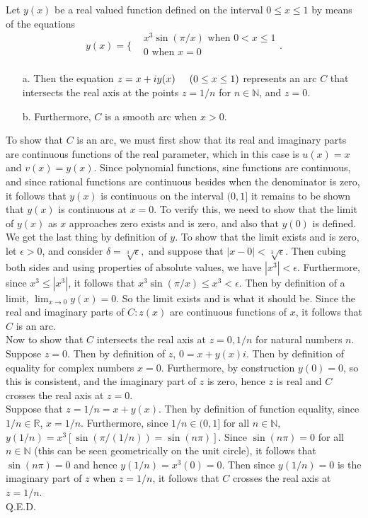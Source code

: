 \documentclass{article}
\theoremstyle{definition}
\newcommand{\R}{\mathbb{R}}
\newcommand{\N}{\mathbb{N}}
\newcommand{\cs}[1]{\color{blue}{#1}\normalcolor}
\begin{document}
 Let $y(x)$ be a real valued function defined on the interval $0\le x\le 1$ by means of the equations 
$$ y(x) = \Big\{\begin{array}{cc}
     & x^3\sin(\pi/x)\mbox{ when }0<x\le 1 \\
     & 0 \mbox{ when } x = 0\\
\end{array}.$$
\begin{itemize}
    \item[a. ] Then the equation $z = x + iy(x)\hspace{0.5cm} (0\le x \le 1)$ represents an arc $C$ that intersects the real axis at the points $z = 1/n$ for $n\in \N$, and $z = 0$.
    \item[b. ] Furthermore, $C$ is a smooth arc when $x> 0$. 
    \end{itemize}
 To show that $C$ is an arc, we must first show that its real and imaginary parts are continuous functions of the real parameter, which in this case is $u(x) = x$ and $v(x) = y(x)$. Since polynomial functions, sine functions are continuous, and since rational functions are continuous besides when the denominator is zero, it follows that $y(x)$ is continuous on the interval $(0,1]$ it remains to be shown that $y(x)$ is continuous at $x = 0$. To verify this, we need to show that the limit of $y(x)$ as $x$ approaches zero exists and is zero, and also that $y(0)$ is defined. We get the last thing by definition of $y$. To show that the limit exists and is zero, let $\epsilon > 0$, and consider $\delta = \sqrt[3]{\epsilon},$ and suppose that $|x-0|< \sqrt[3]{\epsilon}$. Then cubing both sides and using properties of absolute values, we have $|x^3|< \epsilon$. Furthermore, since $x^3 \le |x^3|$, it follows that $x^3\sin(\pi/x) \le x^3 < \epsilon$. Then by definition of a limit, $\lim_{x\rightarrow 0}y(x) = 0.$ \cs{You could also use the Squeeze Theorem here.} So the limit exists and is what it should be. Since the real and imaginary parts of $C:z(x)$ are continuous functions of $x$, it follows that $C$ is an arc.\\
Now to show that $C$ intersects the real axis at $z = 0,1/n$ for natural numbers $n$. Suppose $z = 0$. Then by definition of $z$, $0 = x + y(x)i$. Then by definition of equality for complex numbers $x = 0$. Furthermore, by construction $y(0)=0$, so this is consistent, and the imaginary part of $z$ is zero, hence $z$ is real and $C$ crosses the real axis at $z = 0$.\\
Suppose that $z = 1/n = x + y(x)$. Then by definition of function equality, since $1/n\in \R$, $x = 1/n$. Furthermore, since $1/n\in (0,1]$ for all $n\in \N$, $y(1/n) = x^3[\sin(\pi/(1/n))= \sin(n\pi)].$ Since $\sin(n\pi) = 0$ for all $n
\in \N$ (this can be seen geometrically on the unit circle), it follows that $\sin(n\pi) = 0$ and hence $y(1/n) = x^3(0) = 0$. Then since $y(1/n) =0$ is the imaginary part of $z$ when $z = 1/n$, it follows that $C$ crosses the real axis at $z = 1/n$.\\
Q.E.D. \cs{Are those the *only* places $z$ is 0?}
\end{document}
